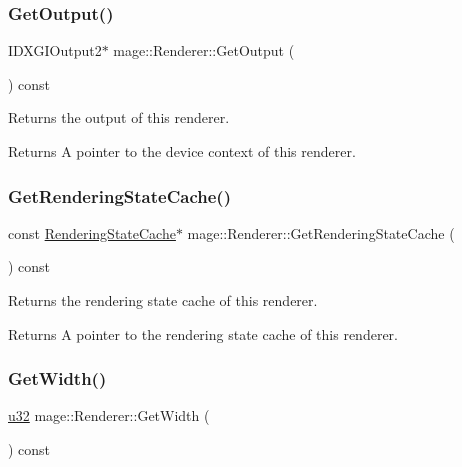 \subsubsection{\texorpdfstring{Get\+Output()}{GetOutput()}}
{\footnotesize\ttfamily I\+D\+X\+G\+I\+Output2$\ast$ mage\+::\+Renderer\+::\+Get\+Output (\begin{DoxyParamCaption}{ }\end{DoxyParamCaption}) const\hspace{0.3cm}{\ttfamily [noexcept]}}

Returns the output of this renderer.

\begin{DoxyReturn}{Returns}
A pointer to the device context of this renderer. 
\end{DoxyReturn}
\hypertarget{classmage_1_1_renderer_a69d87676ed67786935f4de9b86b60c8a}{}\label{classmage_1_1_renderer_a69d87676ed67786935f4de9b86b60c8a} 
\subsubsection{\texorpdfstring{Get\+Rendering\+State\+Cache()}{GetRenderingStateCache()}}
{\footnotesize\ttfamily const \hyperlink{structmage_1_1_rendering_state_cache}{Rendering\+State\+Cache}$\ast$ mage\+::\+Renderer\+::\+Get\+Rendering\+State\+Cache (\begin{DoxyParamCaption}{ }\end{DoxyParamCaption}) const\hspace{0.3cm}{\ttfamily [noexcept]}}

Returns the rendering state cache of this renderer.

\begin{DoxyReturn}{Returns}
A pointer to the rendering state cache of this renderer. 
\end{DoxyReturn}
\hypertarget{classmage_1_1_renderer_af360a0de9cfd16d14b6fdcbbe688cd4f}{}\label{classmage_1_1_renderer_af360a0de9cfd16d14b6fdcbbe688cd4f} 
\subsubsection{\texorpdfstring{Get\+Width()}{GetWidth()}}
{\footnotesize\ttfamily \hyperlink{namespacemage_af2b398bf98eb10351f49cad73fe2cc73}{u32} mage\+::\+Renderer\+::\+Get\+Width (\begin{DoxyParamCaption}{ }\end{DoxyParamCaption}) const\hspace{0.3cm}{\ttfamily [noexcept]}}


